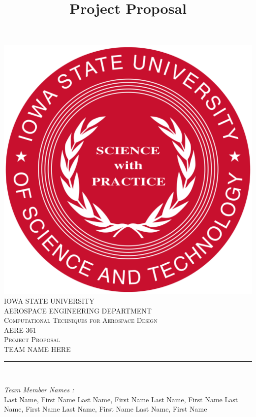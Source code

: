 \documentclass[12pt]{article}
\begin{document}
\title{Project Proposal}

\begin{titlepage}
	\centering
    \vspace*{0.5 cm}
    \includegraphics[scale = 0.11]{isu_seal.png}\\[1.0 cm]	%
    \textsc{\LARGE IOWA STATE UNIVERSITY}\\[2.0 cm]
    \textsc{\large AEROSPACE ENGINEERING DEPARTMENT}\\[0.2 cm]
    \textsc{\large Computational Techniques for Aerospace Design}\\[0.2 cm]
	\textsc{\Large AERE 361}\\[0.5 cm]				%
	\textsc{\Large Project Proposal}\\[0.2 cm]
	\textsc{\Large TEAM NAME HERE}\\[0.2 cm]
	\rule{\linewidth}{0.2 mm} \\[0.4 cm]
	
	
	\begin{minipage}{0.8\textwidth}
		
			\begin{flushleft} 
			\emph{Team Member Names :} \\
			Last Name, First Name\linebreak
			Last Name, First Name\linebreak
			Last Name, First Name\linebreak
			Last Name, First Name\linebreak
			Last Name, First Name\linebreak
			Last Name, First Name\linebreak
			

\end{flushleft}
\end{minipage}
\end{titlepage}
\end{document}
